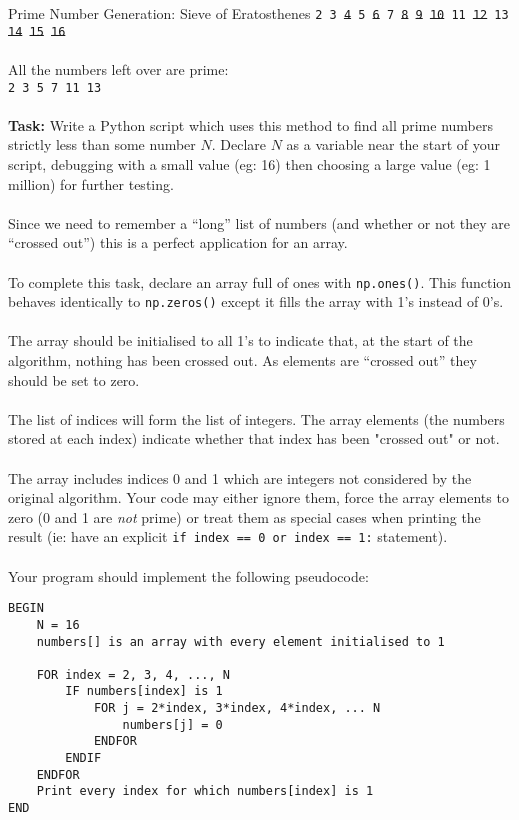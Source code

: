 \documentclass{lab}
\begin{document}
\begin{task}{Prime Number Generation: Sieve of Eratosthenes}{}
\texttt{2 3 \st{4} 5 \st{6} 7 \st{8} \st{9} \st{10} 11 \st{12} 13 \st{14} \st{15} \st{16}}
\\~\\
All the numbers left over are prime:\\
\texttt{2 3 5 7 11 13}
\\~\\
\textbf{Task:} Write a Python script which uses this method to find all prime numbers strictly less than some number $N$. Declare $N$ as a variable near the start of your script, debugging with a small value (eg: 16) then choosing a large value (eg: 1 million) for further testing.
\\~\\
Since we need to remember a ``long'' list of numbers (and whether or not they are ``crossed out'') this is a perfect application for an array.
\\~\\
To complete this task, declare an array full of ones with \texttt{np.ones()}. This function behaves identically to \texttt{np.zeros()} except it fills the array with 1's instead of 0's.
\\~\\
The array should be initialised to all 1's to indicate that, at the start of the algorithm, nothing has been crossed out. As elements are ``crossed out'' they should be set to zero.
\\~\\
The list of indices will form the list of integers. The array elements (the numbers stored at each index) indicate whether that index has been "crossed out" or not.
\\~\\
The array includes indices 0 and 1 which are integers not considered by the original algorithm. Your code may either ignore them, force the array elements to zero (0 and 1 are \textit{not} prime) or treat them as special cases when printing the result (ie: have an explicit \texttt{if index == 0 or index == 1:} statement).
\\~\\
Your program should implement the following pseudocode:
\begin{lstlisting}[style=pseudo]
BEGIN
	N = 16
	numbers[] is an array with every element initialised to 1
	
	FOR index = 2, 3, 4, ..., N
		IF numbers[index] is 1
			FOR j = 2*index, 3*index, 4*index, ... N
				numbers[j] = 0
			ENDFOR
		ENDIF
	ENDFOR
	Print every index for which numbers[index] is 1
END
\end{lstlisting}


\end{task}
\end{document}
